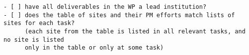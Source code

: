 \begin{draft}
\begin{verbatim}
- [ ] have all deliverables in the WP a lead institution?
- [ ] does the table of sites and their PM efforts match lists of sites for each task?
      (each site from the table is listed in all relevant tasks, and no site is listed
      only in the table or only at some task)
\end{verbatim}
\end{draft}


